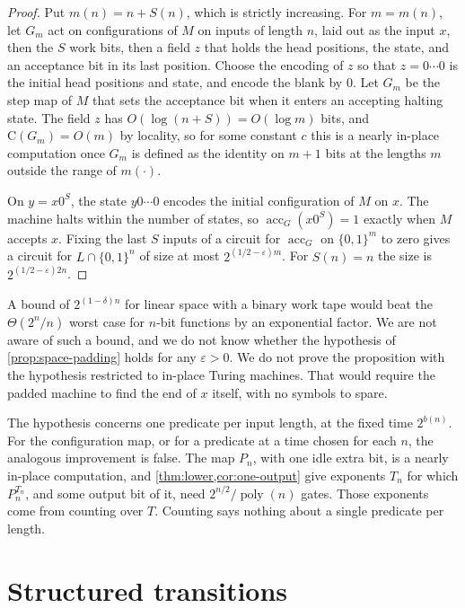 \documentclass[11pt]{article}
\theoremstyle{definition}
\theoremstyle{remark}
\newcommand{\bits}{\{0,1\}}
\newcommand{\CC}{\mathrm{C}}
\newcommand{\poly}{\operatorname{poly}}
\numberwithin{equation}{section}
\begin{document}
\begin{proof}
Put $m(n)=n+S(n)$, which is strictly increasing.  For $m=m(n)$, let
$G_m$ act on configurations of $M$ on inputs of length $n$, laid out as
the input $x$, then the $S$ work bits, then a field $z$ that holds the
head positions, the state, and an acceptance bit in its last position.
Choose the encoding of $z$ so that $z=0\cdots0$ is the initial head
positions and state, and encode the blank by $0$.  Let $G_m$ be the step
map of $M$ that sets the acceptance bit when it enters an accepting
halting state.  The field $z$ has $O(\log(n+S))=O(\log m)$ bits, and
$\CC(G_m)=O(m)$ by locality, so for some constant $c$ this is a nearly
in-place computation once $G_m$ is defined as the identity on $m+1$
bits at the lengths $m$ outside the range of $m(\cdot)$.

On $y=x0^S$, the state $y0\cdots0$ encodes the initial configuration of
$M$ on $x$.  The machine halts within the number of states, so
$\operatorname{acc}_G(x0^S)=1$ exactly when $M$ accepts $x$.  Fixing the
last $S$ inputs of a circuit for $\operatorname{acc}_G$ on $\bits^m$ to
zero gives a circuit for $L\cap\bits^n$ of size at most
$2^{(1/2-\varepsilon)m}$.  For $S(n)=n$ the size is
$2^{(1/2-\varepsilon)2n}$.
\end{proof}

A bound of $2^{(1-\delta)n}$ for linear space with a binary work tape
would beat the $\Theta(2^n/n)$ worst case for $n$-bit functions by an
exponential factor.  We are not aware of such a bound, and we do not
know whether the hypothesis of \cref{prop:space-padding} holds for any
$\varepsilon>0$.  We do not prove the proposition with the hypothesis
restricted to in-place Turing machines.  That would require the padded
machine to find the end of $x$ itself, with no symbols to spare.

The hypothesis concerns one predicate per input length, at the fixed time
$2^{b(n)}$.  For the configuration map, or for a predicate at a time chosen
for each $n$, the analogous improvement is false.  The map $P_n$, with one
idle extra bit, is a nearly in-place computation, and \cref{thm:lower,cor:one-output} give
exponents $T_n$ for which $P_n^{T_n}$, and some output bit of it, need
$2^{n/2}/\poly(n)$ gates.  Those exponents come from counting over $T$.
Counting says nothing about a single predicate per length.

\section{Structured transitions}\label{sec:structured}
\end{document}
